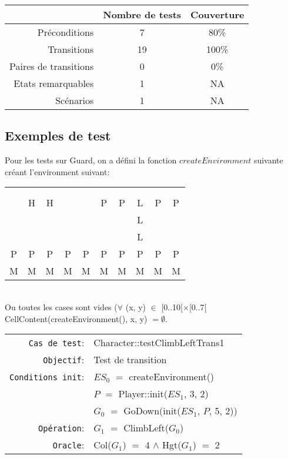 \documentclass{article}
\begin{document}
\begin{longtable}{r|cc}
  &Nombre de tests&Couverture\\
  \hline
  Préconditions & 7 & 80\%\\
  Transitions & 19 & 100\%\\
  Paires de transitions & 0 & 0\%\\
  Etats remarquables & 1 & NA\\
  Scénarios & 1 & NA\\
\end{longtable}

\subsection{Exemples de test}

Pour les tests sur Guard, on a défini la fonction $createEnvironment$ suivante créant l'environment suivant:\\
\begin{tabular}{cccccccccc}
   & & & & & & & & & \\
   & & & & & & & & & \\
   &H&H& & &P&P&L&P&P\\
   & & & & & & &L& & \\
   & & & & & & &L& & \\
  P&P&P&P&P&P&P&P&P&P\\
  M&M&M&M&M&M&M&M&M&M
\end{tabular}\\
\noindent Ou toutes les cases sont vides ($\forall$ (x, y) $\in$ [0..10[$\times$[0..7[ \textrm{CellContent(createEnvironment(), x, y)} $= \emptyset$.

{\small
  \begin{longtable}{rl}
    \texttt{Cas de test}: &\textrm{Character::testClimbLeftTrans1}\\
    \texttt{Objectif}: & Test de transition \\
    \texttt{Conditions init}: & $ES_0$ $=$ \textrm{createEnvironment()}\\
    & $P$ $=$ \textrm{Player::init($ES_1$, 3, 2)}\\
    & $G_0$ $=$ \textrm{GoDown(init($ES_1$, $P$, 5, 2))}\\
    \texttt{Opération}: &$G_1$ $=$ \textrm{ClimbLeft($G_0$)}\\
    \texttt{Oracle}: &\textrm{Col($G_1$)} $=$ 4 $\land$ \textrm{Hgt($G_1$)} $=$ 2\\
  \end{longtable}}
\end{document}
